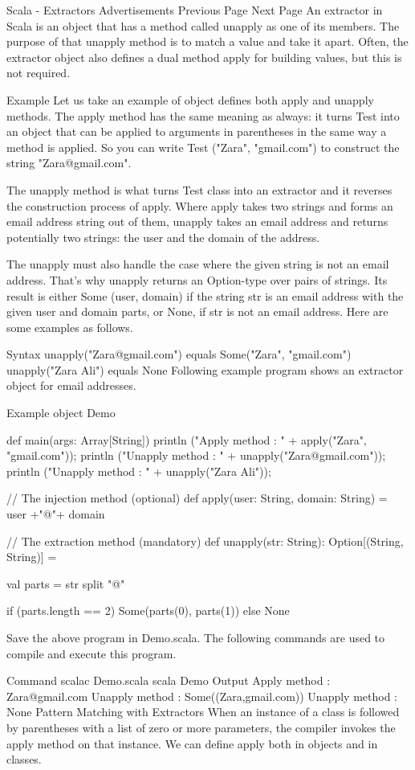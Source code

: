 Scala - Extractors
Advertisements
 Previous Page Next Page  
An extractor in Scala is an object that has a method called unapply as one of its members. The purpose of that unapply method is to match a value and take it apart. Often, the extractor object also defines a dual method apply for building values, but this is not required.

Example
Let us take an example of object defines both apply and unapply methods. The apply method has the same meaning as always: it turns Test into an object that can be applied to arguments in parentheses in the same way a method is applied. So you can write Test ("Zara", "gmail.com") to construct the string "Zara@gmail.com".

The unapply method is what turns Test class into an extractor and it reverses the construction process of apply. Where apply takes two strings and forms an email address string out of them, unapply takes an email address and returns potentially two strings: the user and the domain of the address.

The unapply must also handle the case where the given string is not an email address. That's why unapply returns an Option-type over pairs of strings. Its result is either Some (user, domain) if the string str is an email address with the given user and domain parts, or None, if str is not an email address. Here are some examples as follows.

Syntax
unapply("Zara@gmail.com") equals Some("Zara", "gmail.com")
unapply("Zara Ali") equals None
Following example program shows an extractor object for email addresses.

Example
object Demo {
   def main(args: Array[String]) {
      println ("Apply method : " + apply("Zara", "gmail.com"));
      println ("Unapply method : " + unapply("Zara@gmail.com"));
      println ("Unapply method : " + unapply("Zara Ali"));
   }
   
   // The injection method (optional)
   def apply(user: String, domain: String) = {
      user +"@"+ domain
   }

   // The extraction method (mandatory)
   def unapply(str: String): Option[(String, String)] = {
      val parts = str split "@"
      
      if (parts.length == 2){
         Some(parts(0), parts(1)) 
      } else {
         None
      }
   }
}
Save the above program in Demo.scala. The following commands are used to compile and execute this program.

Command
\>scalac Demo.scala
\>scala Demo
Output
Apply method : Zara@gmail.com
Unapply method : Some((Zara,gmail.com))
Unapply method : None
Pattern Matching with Extractors
When an instance of a class is followed by parentheses with a list of zero or more parameters, the compiler invokes the apply method on that instance. We can define apply both in objects and in classes.

